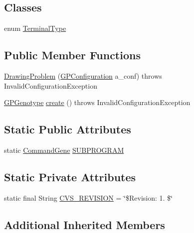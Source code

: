 \subsection*{Classes}
\begin{DoxyCompactItemize}
\item 
enum \hyperlink{enumexamples_1_1gp_1_1monalisa_1_1core_1_1_drawing_problem_1_1_terminal_type}{Terminal\-Type}
\end{DoxyCompactItemize}
\subsection*{Public Member Functions}
\begin{DoxyCompactItemize}
\item 
\hyperlink{classexamples_1_1gp_1_1monalisa_1_1core_1_1_drawing_problem_a6978a1796b8fc76f97786ab26bd4d684}{Drawing\-Problem} (\hyperlink{classorg_1_1jgap_1_1gp_1_1impl_1_1_g_p_configuration}{G\-P\-Configuration} a\-\_\-conf)  throws Invalid\-Configuration\-Exception 
\item 
\hyperlink{classorg_1_1jgap_1_1gp_1_1impl_1_1_g_p_genotype}{G\-P\-Genotype} \hyperlink{classexamples_1_1gp_1_1monalisa_1_1core_1_1_drawing_problem_a5c391c027376cc876de2672312b7cfa0}{create} ()  throws Invalid\-Configuration\-Exception 
\end{DoxyCompactItemize}
\subsection*{Static Public Attributes}
\begin{DoxyCompactItemize}
\item 
static \hyperlink{classorg_1_1jgap_1_1gp_1_1_command_gene}{Command\-Gene} \hyperlink{classexamples_1_1gp_1_1monalisa_1_1core_1_1_drawing_problem_a3269ac3bd1f2c02ec84f29cda79282c3}{S\-U\-B\-P\-R\-O\-G\-R\-A\-M}
\end{DoxyCompactItemize}
\subsection*{Static Private Attributes}
\begin{DoxyCompactItemize}
\item 
static final String \hyperlink{classexamples_1_1gp_1_1monalisa_1_1core_1_1_drawing_problem_a99ad1787f05be2ea069f05b7a4353b07}{C\-V\-S\-\_\-\-R\-E\-V\-I\-S\-I\-O\-N} = \char`\"{}\$Revision\-: 1. \$\char`\"{}
\end{DoxyCompactItemize}
\subsection*{Additional Inherited Members}


